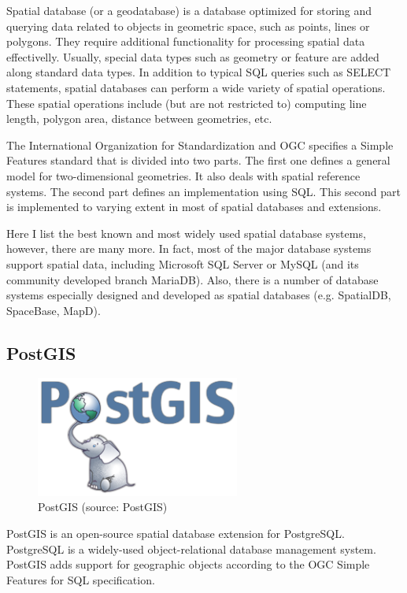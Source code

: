 Spatial database (or a geodatabase) is a database optimized for
storing and querying data related to objects in geometric space, such
as points, lines or polygons. They require additional functionality
for processing spatial data effectivelly. Usually, special data types
such as geometry or feature are added along standard data types. In
addition to typical SQL queries such as SELECT statements, spatial
databases can perform a wide variety of spatial operations. These
spatial operations include (but are not restricted to) computing line
length, polygon area, distance between geometries, etc.

The International Organization for Standardization and OGC specifies a
Simple Features standard that is divided into two parts. The first one
defines a general model for two-dimensional geometries. It also deals
with spatial reference systems. The second part defines an
implementation using SQL. This second part is implemented to varying
extent in most of spatial databases and extensions.

Here I list the best known and most widely used spatial database
systems, however, there are many more. In fact, most of the major
database systems support spatial data, including Microsoft SQL Server
or MySQL (and its community developed branch MariaDB). Also, there is
a number of database systems especially designed and developed as
spatial databases (e.g. SpatialDB, SpaceBase, MapD).

\subsection{PostGIS}
\begin{figure}[H] \centering
      \includegraphics[width=190pt]{./pictures/postgis.png}
      \caption[PostGIS logo]{PostGIS (source: PostGIS)}
      \label{fig:PostGIS}
  \end{figure}
  
PostGIS is an open-source spatial database extension for
PostgreSQL. PostgreSQL is a widely-used object-relational database
management system. PostGIS adds support for geographic objects
according to the OGC Simple Features for SQL specification.

